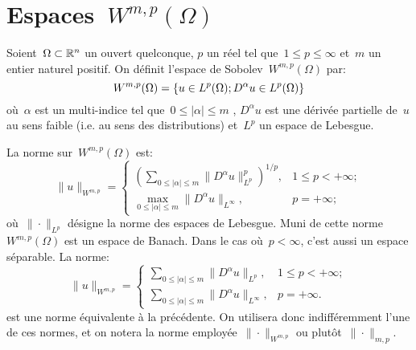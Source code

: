 \medskip
{}





\medskip
\section{Espaces~$W^{m,p}(\Omega)$}

\begin{definition}
Soient~$\Omega \subset \mathbb R^n$ un ouvert quelconque, $p$ un réel tel que~$1\leqslant p\leqslant \infty$ et~$m$ un entier naturel positif.
On définit l'espace de Sobolev~$W^{m,p}(\Omega)$ par:
\begin{equation}\label{Eq-SoboW}\colorred
W^{m, p}(\Omega)=\{u\in L^p(\Omega); D^\alpha u \in L^p(\Omega)\}
\end{equation}
où~$\alpha$ est un multi-indice tel que~$0\leqslant |\alpha| \leqslant m$ , $D^\alpha u$ est une dérivée partielle de~$u$ au sens faible (i.e. au sens des distributions) et~$L^p$ un espace de Lebesgue.
\end{definition}

\medskip
La norme sur~$W^{m,p}(\Omega)$ est:
\begin{equation}
\| u \|_{W^{m, p}} = \begin{cases} \left( \sum \limits_{0\leqslant | \alpha | \leqslant m} \| D^{\alpha} u \|_{L^{p}}^{p} \right)^{1/p}, & 1 \leqslant p < + \infty; \\ \max\limits _{0\leqslant | \alpha | \leqslant m} \| D^{\alpha} u \|_{L^{\infty}}, & p = + \infty; \end{cases}
\end{equation}
où~$\|\cdot\|_{L^{p}}$ désigne la norme des espaces de Lebesgue.
Muni de cette norme~$W^{m,p}(\Omega)$ est un espace de Banach.
Dans le cas où~$p<\infty$, c'est aussi un espace séparable.
\medskipvm
La norme:
\begin{equation}
\| u \|_{W^{m, p}} = 
   \begin{cases} 
   \sum\limits _{0\leqslant | \alpha | \leqslant m} \| D^{\alpha} u \|_{L^{p}}, & 1 \leqslant p < + \infty; \\ \sum\limits _{0 \leqslant | \alpha | \leqslant m} \| D^{\alpha} u \|_{L^{\infty}}, & p = + \infty. 
   \end{cases}
\end{equation}
est une norme équivalente à la précédente. On utilisera donc indifféremment l'une de ces normes, et on notera la norme employée~$\|\cdot\|_{W^{m, p}}$ ou plutôt~$\|\cdot\|_{m, p}$.

